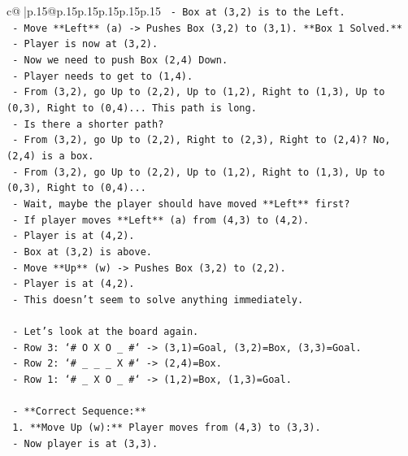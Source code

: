 \documentclass{article}
\begin{document}
{\begin{supertabular}{c@{$\;$}|p{.15\linewidth}@{}p{.15\linewidth}p{.15\linewidth}p{.15\linewidth}p{.15\linewidth}p{.15\linewidth}}
{{{\texttt{            {-} Box at (3,2) is to the Left.} \\
\texttt{            {-} Move **Left** (a) {-}> Pushes Box (3,2) to (3,1). **Box 1 Solved.**} \\
\texttt{            {-} Player is now at (3,2).} \\
\texttt{            {-} Now we need to push Box (2,4) Down.} \\
\texttt{            {-} Player needs to get to (1,4).} \\
\texttt{            {-} From (3,2), go Up to (2,2), Up to (1,2), Right to (1,3), Up to (0,3), Right to (0,4)... This path is long.} \\
\texttt{            {-} Is there a shorter path?} \\
\texttt{            {-} From (3,2), go Up to (2,2), Right to (2,3), Right to (2,4)? No, (2,4) is a box.} \\
\texttt{            {-} From (3,2), go Up to (2,2), Up to (1,2), Right to (1,3), Up to (0,3), Right to (0,4)...} \\
\texttt{            {-} Wait, maybe the player should have moved **Left** first?} \\
\texttt{            {-} If player moves **Left** (a) from (4,3) to (4,2).} \\
\texttt{                {-} Player is at (4,2).} \\
\texttt{                {-} Box at (3,2) is above.} \\
\texttt{                {-} Move **Up** (w) {-}> Pushes Box (3,2) to (2,2).} \\
\texttt{                {-} Player is at (4,2).} \\
\texttt{                {-} This doesn't seem to solve anything immediately.} \\
\\ 
\texttt{    {-} Let's look at the board again.} \\
\texttt{    {-} Row 3: `\# O X O \_ \#` {-}> (3,1)=Goal, (3,2)=Box, (3,3)=Goal.} \\
\texttt{    {-} Row 2: `\# \_ \_ \_ X \#` {-}> (2,4)=Box.} \\
\texttt{    {-} Row 1: `\# \_ X O \_ \#` {-}> (1,2)=Box, (1,3)=Goal.} \\
\\ 
\texttt{    {-} **Correct Sequence:**} \\
\texttt{        1.  **Move Up (w):** Player moves from (4,3) to (3,3).} \\
\texttt{            {-} Now player is at (3,3).} \\
}}}
\end{supertabular}}
\end{document}
